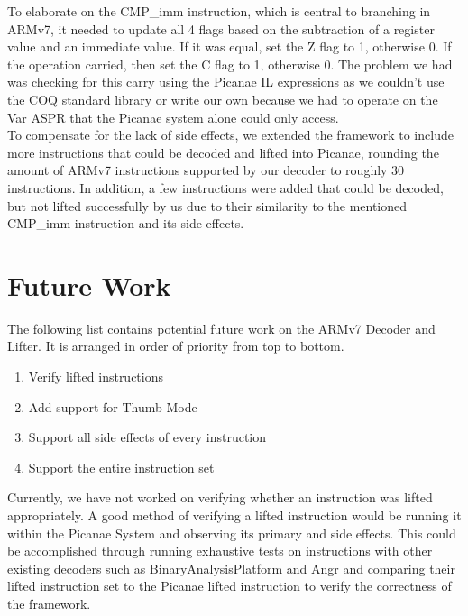 \documentclass[twocolumn]{article}
\begin{document}
To elaborate on the CMP\_imm instruction, which is central to branching in ARMv7, it needed to update all 4 flags based on the subtraction of a register value and an immediate value. If it was equal, set the Z flag to 1, otherwise 0. If the operation carried, then set the C flag to 1, otherwise 0. The problem we had was checking for this carry using the Picanae IL expressions as we couldn't use the COQ standard library or write our own because we had to operate on the Var ASPR that the Picanae system alone could only access.\\

To compensate for the lack of side effects, we extended the framework to include more instructions that could be decoded and lifted into Picanae, rounding the amount of ARMv7 instructions supported by our decoder to roughly 30 instructions. In addition, a few instructions were added that could be decoded, but not lifted successfully by us due to their similarity to the mentioned CMP\_imm instruction and its side effects.


\section*{\centering Future Work}
\vspace{0.3cm}

The following list contains potential future work on the ARMv7 Decoder and Lifter. It is arranged in order of priority from top to bottom.\\
\begin{enumerate}
	\item Verify lifted instructions
	\item Add support for Thumb Mode
	\item Support all side effects of every instruction
	\item Support the entire instruction set\\
\end{enumerate}

Currently, we have not worked on verifying whether an instruction was lifted appropriately. A good method of verifying a lifted instruction would be running it within the Picanae System and observing its primary and side effects. This could be accomplished through running exhaustive tests on instructions with other existing decoders such as BinaryAnalysisPlatform and Angr and comparing their lifted instruction set to the Picanae lifted instruction to verify the correctness of the framework.\\
\end{document}
